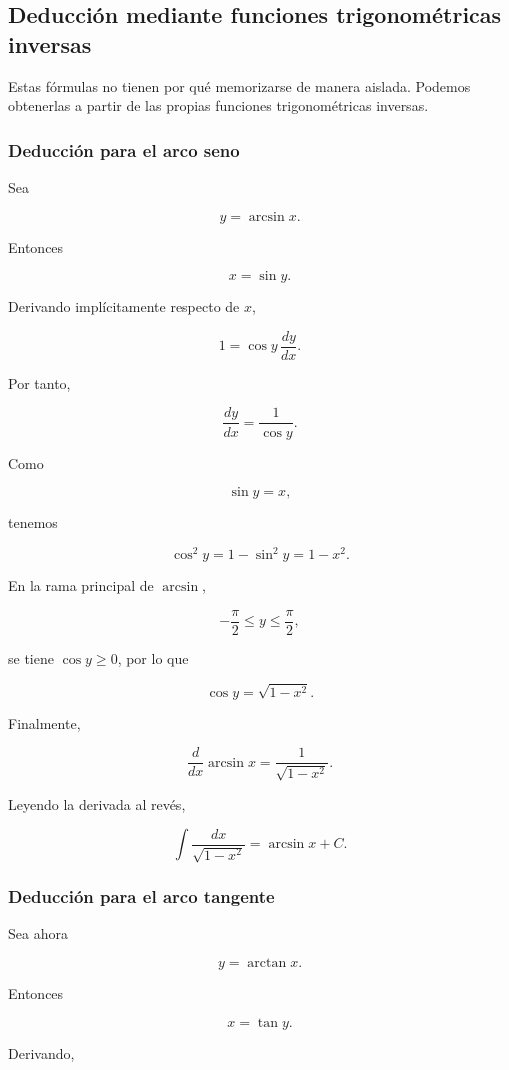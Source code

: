\documentclass[12pt]{article}
\theoremstyle{definition}
\theoremstyle{remark}
\begin{document}
\subsection*{Deducción mediante funciones trigonométricas inversas}

Estas fórmulas no tienen por qué memorizarse de manera aislada.
Podemos obtenerlas a partir de las propias funciones trigonométricas
inversas.

\subsubsection*{Deducción para el arco seno}

Sea

\[
y=\arcsin x.
\]

Entonces

\[
x=\sin y.
\]

Derivando implícitamente respecto de \(x\),

\[
1=\cos y\,\frac{dy}{dx}.
\]

Por tanto,

\[
\frac{dy}{dx}
=
\frac1{\cos y}.
\]

Como

\[
\sin y=x,
\]

tenemos

\[
\cos^2y
=
1-\sin^2y
=
1-x^2.
\]

En la rama principal de \(\arcsin\),

\[
-\frac{\pi}{2}\le y\le\frac{\pi}{2},
\]

se tiene \(\cos y\ge0\), por lo que

\[
\cos y=\sqrt{1-x^2}.
\]

Finalmente,

\[
\boxed{
\frac{d}{dx}\arcsin x
=
\frac1{\sqrt{1-x^2}}
}.
\]

Leyendo la derivada al revés,

\[
\boxed{
\int\frac{dx}{\sqrt{1-x^2}}
=
\arcsin x+C.
}
\]

\subsubsection*{Deducción para el arco tangente}

Sea ahora

\[
y=\arctan x.
\]

Entonces

\[
x=\tan y.
\]

Derivando,
\end{document}
